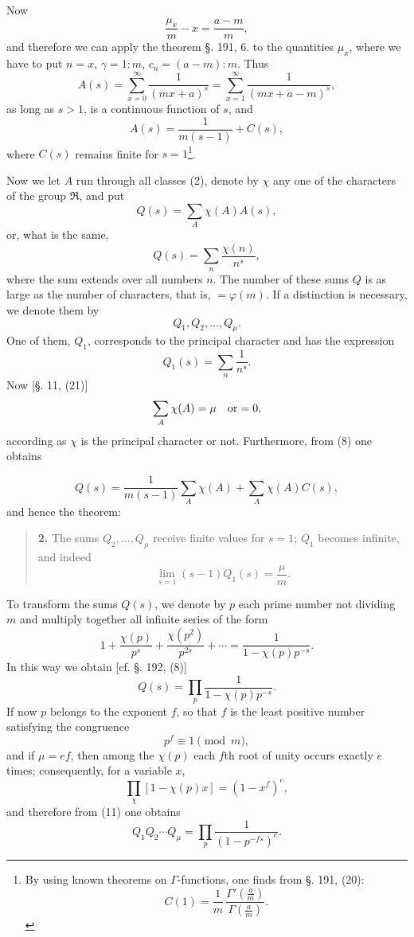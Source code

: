 \documentclass[11pt]{article}
\begin{document}
Now
\[
\frac{\mu_x}{m}-x=\frac{a-m}{m},
\]
and therefore we can apply the theorem §. 191, 6. to the quantities $\mu_x$, where we have to put $n=x$, $\gamma=1:m$, $c_n=(a-m):m$. Thus
\begin{equation}\tag{7}
A(s)=\sum_{x=0}^{\infty}\frac{1}{(mx+a)^s}
     =\sum_{x=1}^{\infty}\frac{1}{(mx+a-m)^s},
\end{equation}
as long as $s>1$, is a continuous function of $s$, and
\begin{equation}\tag{8}
A(s)=\frac{1}{m(s-1)}+C(s),
\end{equation}
where $C(s)$ remains finite for $s=1$\footnote{By using known theorems on $\Gamma$-functions, one finds from §. 191, (20):
\[
C(1)=\frac1m\,\frac{\Gamma'\!\left(\frac am\right)}{\Gamma\!\left(\frac am\right)}.
\]
}.

Now we let $A$ run through all classes (2), denote by $\chi$ any one of the characters of the group $\mathfrak R$, and put
\begin{equation}\tag{9}
Q(s)=\sum_A \chi(A)A(s),
\end{equation}
or, what is the same,
\begin{equation}\tag{10}
Q(s)=\sum_n \frac{\chi(n)}{n^s},
\end{equation}
where the sum extends over all numbers $n$. The number of these sums $Q$ is as large as the number of characters, that is, $=\varphi(m)$. If a distinction is necessary, we denote them by
\[
Q_1,Q_2,\ldots,Q_\mu.
\]
One of them, $Q_1$, corresponds to the principal character and has the expression
\[
Q_1(s)=\sum_n\frac1{n^s}.
\]
Now [§. 11, (21)]
\[
\sum_A \chi(A)=\mu\quad \hbox{or}=0,
\]
according as $\chi$ is the principal character or not. Furthermore, from (8) one obtains

\[
Q(s)=\frac{1}{m(s-1)}\sum_A \chi(A)+\sum_A\chi(A)C(s),
\]
and hence the theorem:

\begin{quote}
\textbf{2.} The sums $Q_2,\ldots,Q_\mu$ receive finite values for $s=1$; $Q_1$ becomes infinite, and indeed
\[
\lim_{s=1}(s-1)Q_1(s)=\frac{\mu}{m}.
\]
\end{quote}

To transform the sums $Q(s)$, we denote by $p$ each prime number not dividing $m$ and multiply together all infinite series of the form
\[
1+\frac{\chi(p)}{p^s}+\frac{\chi(p^2)}{p^{2s}}+\cdots
=\frac{1}{1-\chi(p)p^{-s}}.
\]
In this way we obtain [cf. §. 192, (8)]
\begin{equation}\tag{11}
Q(s)=\prod_p \frac{1}{1-\chi(p)p^{-s}}.
\end{equation}
If now $p$ belongs to the exponent $f$, so that $f$ is the least positive number satisfying the congruence
\begin{equation}\tag{12}
p^f\equiv1 \pmod m,
\end{equation}
and if $\mu=ef$, then among the $\chi(p)$ each $f$th root of unity occurs exactly $e$ times; consequently, for a variable $x$,
\[
\prod_{\chi}[1-\chi(p)x]=(1-x^f)^e,
\]
and therefore from (11) one obtains
\begin{equation}\tag{13}
Q_1Q_2\cdots Q_\mu=\prod_p \frac{1}{(1-p^{-fs})^e}.
\end{equation}
\end{document}
